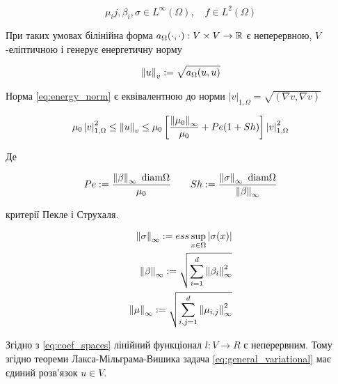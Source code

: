 \begin{equation}\label{eq:coef_spaces}
	\mu_ij, \beta_i, \sigma \in L^\infty(\Omega), \quad f \in L^2(\Omega)
\end{equation}

При таких умовах білінійна форма $a_\Omega (\cdot,\cdot): V \times V  \to \mathbb{R}$ є неперервною, $V$-еліптичною і генерує енергетичну норму

\begin{equation}\label{eq:energy_norm}
	\left\lVert u\right\rVert_v := \sqrt{a_\Omega(u,u)}
\end{equation}

\newcommand{\vonenorm}{\left|v\right|_{1,\Omega}}

Норма \eqref{eq:energy_norm} є еквівалентною до норми $\vonenorm = \sqrt{(\nabla v, \nabla v)}$

\newcommand{\infnorm}[1]{\norm{#1}_\infty}

\begin{equation}\label{eq:norm_equivalence}
	\mu_0 \vonenorm^2 \le \norm{u}_v \le
		\mu_0
			\left[
				\frac{\norm{\mu_0}_\infty}{\mu_0}+Pe(1+Sh)
			\right]
		\vonenorm^2
\end{equation}

Де

\begin{equation}
	Pe:= \frac{\infnorm{\beta} \text{ diam} \Omega}{\mu_0} \qquad
	Sh:= \frac{\infnorm{\sigma} \text{ diam} \Omega}{\infnorm{\beta}}
\end{equation}

критерії Пекле і Струхаля.

\begin{equation}
	\begin{split}
		\infnorm{\sigma} := ess \sup \limits_{x \in \Omega} |\sigma(x)| \\
		\infnorm{\beta} := \sqrt{\sum \limits_{i=1}^d \infnorm{\beta_i}^2} \\
		\infnorm{\mu} := \sqrt{\sum \limits_{i,j=1}^d \infnorm{\mu_{i,j}}^2}
	\end{split}
\end{equation}

\undef{\vonenorm}

Згідно з
\eqref{eq:coef_spaces} лінійний функціонал $l : V \to R$ є неперервним.
Тому згідно теореми Лакса-Мільграма-Вишика задача
\eqref{eq:general_variational} має єдиний розв'язок $u \in V$.

